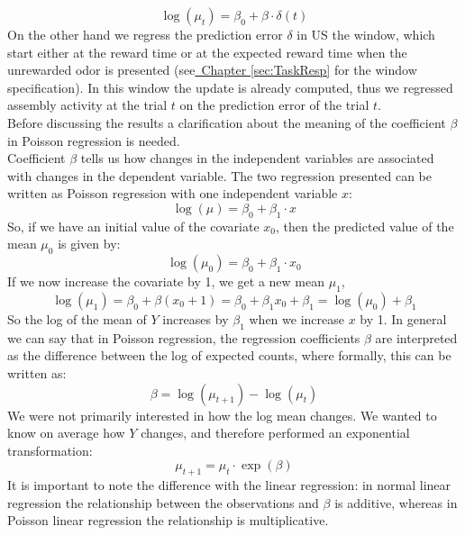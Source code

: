 \begin{equation}
    \log(\mu_t)=\beta_0+\beta\cdot\delta(t)
    \label{eq:regrDelta}
\end{equation}
On the other hand we regress the prediction error $\delta$ in US the window, which start either at the reward time or at the expected reward time when the unrewarded odor is presented (see\hyperref[sec:TaskResp]{~Chapter \ref*{sec:TaskResp}} for the window specification). In this window the update is already computed, thus we regressed assembly activity at the trial $t$ on the prediction error of the trial $t$.\\
Before discussing the results a clarification about the meaning of the coefficient $\beta$ in Poisson regression is needed.\\
Coefficient $\beta$ tells us how changes in the independent variables are associated with changes in the dependent variable.
The two regression presented can be written as Poisson regression with one independent variable $x$:
\begin{equation}
    \log(\mu)=\beta_0+\beta_1\cdot x
    \label{eq:betaCoeff}
\end{equation}
So, if we have an initial value of the covariate $x_0$, then the predicted value of the mean $\mu_0$ is given by:
\begin{equation*}
    \log(\mu_0)=\beta_0+\beta_1\cdot x_0
    \label{eq:betaCoeff0}
\end{equation*}
If we now increase the covariate by 1, we get a new mean $\mu_1$,
\begin{equation*}
    \log(\mu_1)=\beta_0+\beta(x_0+1)=\beta_0+\beta_1x_0+\beta_1=\log(\mu_0)+\beta_1
    \label{eq:betaCoeff1}
\end{equation*}
So the log of the mean of $Y$ increases by $\beta_1$ when we increase $x$ by 1.
In general we can say that in Poisson regression, the regression coefficients $\beta$ are interpreted as the difference between the log of expected counts, where formally, this can be written as:
\begin{equation}
    \beta=\log(\mu_{t+1})-\log(\mu_t)
    \label{eq:BetaRelLog}
\end{equation}
We were not primarily interested in how the log mean changes. We wanted to know on average how $Y$ changes, and therefore performed an exponential transformation:
\begin{equation}
    \mu_{t+1}=\mu_t\cdot \exp(\beta)
    \label{eq:BetaRelExp}
\end{equation}
It is important to note the difference with the linear regression: in normal linear regression the relationship between the observations and $\beta$ is additive, whereas in Poisson linear regression the relationship is multiplicative.\\
